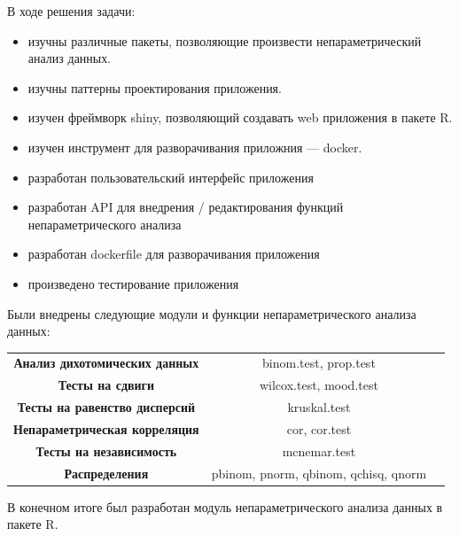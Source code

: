 \documentclass[14pt,a4paper]{scrartcl}
\begin{document}
    В ходе решения задачи:
    \begin{itemize}
        \item изучны различные пакеты, позволяющие произвести непараметрический анализ данных.
        \item изучны паттерны проектирования приложения.
        \item изучен фреймворк shiny, позволяющий создавать web приложения в пакете R.
        \item изучен инструмент для разворачивания приложния --- docker.
        \item разработан пользовательский интерфейс приложения
        \item разработан API для внедрения / редактирования функций непараметрического анализа
        \item разработан dockerfile для разворачивания приложения
        \item произведено тестирование приложения
    \end{itemize}

    Были внедрены следующие модули и функции непараметрического анализа данных:

    \begin{center}
        \begin{tabular}{ccc}
            \textbf{Анализ дихотомических данных} & binom.test, prop.test\\
            \textbf{Тесты на сдвиги} & wilcox.test, mood.test\\
            \textbf{Тесты на равенство дисперсий} & kruskal.test\\
            \textbf{Непараметрическая корреляция} & cor, cor.test\\
            \textbf{Тесты на независимость} & mcnemar.test\\
            \textbf{Распределения} & pbinom, pnorm, qbinom, qchisq, qnorm\\
        \end{tabular}
    \end{center}

    В конечном итоге был разработан модуль непараметрического анализа данных в пакете R.
\end{document}
